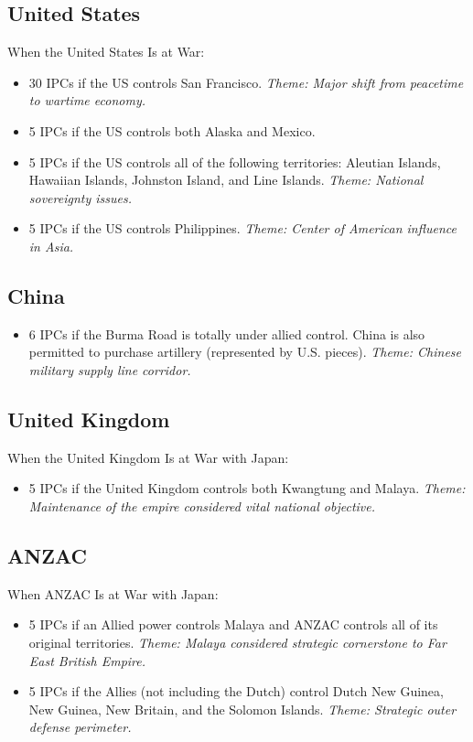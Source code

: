 \documentclass[10pt,a4paper,landscape]{article}
\begin{document}
\begin{multicols*}{3}
\columnbreak
\noindent
\begin{minipage}{7.5cm}
\hspace{-2mm}
\subsection*{United States}
When the United States Is at War:
\begin{itemize}
\item 30 IPCs if the US controls San Francisco. \textsl{Theme: Major shift from peacetime to wartime economy.}
\item 5 IPCs if the US controls both Alaska and Mexico.
\item 5 IPCs if the US controls all of the following territories: Aleutian Islands, Hawaiian Islands, Johnston Island, and Line Islands. \textsl{Theme: National sovereignty issues.}
\item 5 IPCs if the US controls Philippines. \textsl{Theme: Center of American influence in Asia.}
\end{itemize}

\subsection*{China}
\begin{itemize}
\item 6 IPCs if the Burma Road is totally under allied control. China is also permitted to purchase artillery (represented by U.S. pieces). \textsl{Theme: Chinese military supply line corridor.}
\end{itemize}
\end{minipage}

\columnbreak
\noindent
\begin{minipage}{\linewidth}
\subsection*{United Kingdom}
When the United Kingdom Is at War with Japan:
\begin{itemize}
\item 5 IPCs if the United Kingdom controls both Kwangtung
and Malaya. \textsl{Theme: Maintenance of the empire considered vital national objective.}
\end{itemize}

\subsection*{ANZAC}
When ANZAC Is at War with Japan:
\begin{itemize}
\item 5 IPCs if an Allied power controls Malaya and ANZAC controls all of its original territories. \textsl{Theme: Malaya considered strategic cornerstone to Far East British Empire.}
\item 5 IPCs if the Allies (not including the Dutch) control Dutch New Guinea, New Guinea, New Britain, and the Solomon Islands. \textsl{Theme: Strategic outer defense perimeter.}
\end{itemize}
\end{minipage}

\end{multicols*}
\end{document}
